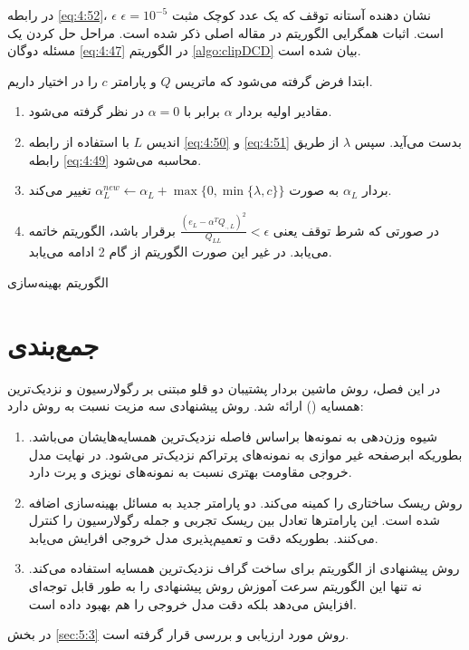 در رابطه \ref{eq:4:52}،  $\epsilon$ نشان دهنده آستانه توقف که یک عدد کوچک مثبت  $\epsilon=10^{-5}$ است. اثبات همگرایی الگوریتم  در مقاله اصلی \cite{peng2014} ذکر شده است. مراحل حل کردن یک مسئله دوگان \ref{eq:4:47} در الگوریتم \ref{algo:clipDCD} بیان شده است. 

\begin{algorithm}[h]
\begin{steps}
		
ابتدا فرض گرفته می‌شود که ماتریس $Q$  و پارامتر $c$  را در اختیار داریم.

\begin{enumerate}
	\item 	مقادیر اولیه بردار $\alpha$  برابر با $\alpha=0$  در نظر گرفته می‌شود.
	\item 	اندیس $L$  با استفاده از رابطه \ref{eq:4:50} و \ref{eq:4:51} بدست می‌آید. سپس $\lambda$  از طریق رابطه \ref{eq:4:49} محاسبه می‌شود.
	\item 	بردار $\alpha_{L}$  به صورت $\alpha^{new}_{L} \leftarrow \alpha_{L} + \mathop{max}\{0, \mathop{min}\{\lambda,c\}\}$  تغییر می‌کند.
	\item 	در صورتی که شرط توقف یعنی $\frac{(e_{L} - \alpha^{T}Q_{.,L})^{2}}{Q_{LL}} < \epsilon$  برقرار باشد، الگوریتم خاتمه می‌یابد. در غیر این صورت الگوریتم از گام 2 ادامه می‌یابد.
\end{enumerate}
\end{steps}
\caption{الگوریتم بهینه‌سازی }
\label{algo:clipDCD}
\end{algorithm}

\section{جمع‌بندی}\label{sec:4:8}
در این فصل، روش ماشین بردار پشتیبان دو قلو مبتنی بر رگولارسیون و نزدیک‌ترین همسایه () ارائه شد. روش پیشنهادی سه مزیت نسبت به روش  دارد:
\begin{enumerate}
	\item 	شیوه وزن‌دهی به نمونه‌ها براساس فاصله نزدیک‌ترین همسایه‌هایشان می‌باشد. بطوریکه ابرصفحه غیر موازی به نمونه‌های پرتراکم نزدیک‌تر می‌شود. در نهایت مدل خروجی مقاومت بهتری نسبت به نمونه‌های نویزی و پرت دارد.
	\item 	روش   ریسک ساختاری را کمینه می‌کند. دو پارامتر جدید به مسائل بهینه‌سازی اضافه شده است. این پارامترها تعادل بین ریسک تجربی و جمله رگولارسیون را کنترل می‌کنند. بطوریکه دقت و تعمیم‌پذیری مدل خروجی افرایش می‌یابد.
	\item روش پیشنهادی از الگوریتم  برای ساخت گراف نزدیک‌ترین همسایه استفاده می‌کند. نه تنها این الگوریتم سرعت آموزش روش پیشنهادی را به طور قابل توجه‌ای افزایش می‌دهد بلکه دقت مدل خروجی را هم بهبود داده است.
\end{enumerate}

در بخش \ref{sec:5:3} روش  مورد ارزیابی و بررسی قرار گرفته است.
